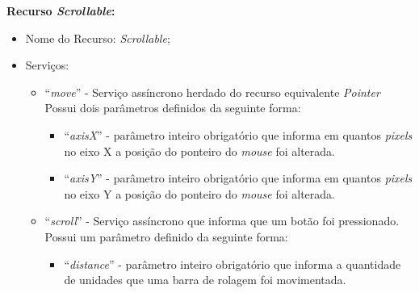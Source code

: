 \textbf{Recurso \emph{Scrollable}:}

\begin{itemize}
	
	\item Nome do Recurso: \emph{Scrollable};

	\item Serviços:
		
		\begin{itemize}

			\item ``\emph{move}'' - Serviço assíncrono herdado do recurso equivalente \emph{Pointer} Possui dois parâmetros definidos da seguinte forma:

				\begin{itemize}
					\item ``\emph{axisX}'' - parâmetro inteiro obrigatório que informa em quantos \emph{pixels} no eixo X a posição do ponteiro do \emph{mouse} foi alterada.

					\item ``\emph{axisY}'' - parâmetro inteiro obrigatório que informa em quantos \emph{pixels} no eixo Y a posição do ponteiro do \emph{mouse} foi alterada.
				\end{itemize}
			
			\item ``\emph{scroll}'' - Serviço assíncrono que informa que um botão foi pressionado. Possui um parâmetro definido da seguinte forma:

				\begin{itemize}
					\item ``\emph{distance}'' - parâmetro inteiro obrigatório que informa a quantidade de unidades que uma barra de rolagem foi movimentada.
				\end{itemize}

		\end{itemize}
\end{itemize}

